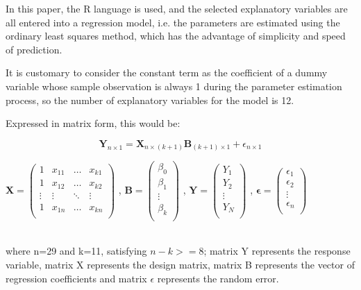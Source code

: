 \documentclass{apmcmthesis}
\begin{document}
In this paper, the R language is used, and the selected explanatory variables are all entered into a regression model, i.e. the parameters are estimated using the ordinary least squares method, which has the advantage of simplicity and speed of prediction. 

It is customary to consider the constant term as the coefficient of a dummy variable whose sample observation is always 1 during the parameter estimation process, so the number of explanatory variables for the model is 12. 

Expressed in matrix form, this would be:

$$ \textbf{Y}_{n\times 1}=\textbf{X}_{n\times(k+1)}\textbf{B}_{(k+1)\times 1}+\epsilon_{n\times 1}$$

$
\mathbf{X} = \left(
\begin{array}{cccc}
	1 & x_{11} & \ldots & x_{k1}\\
	1 & x_{12} & \ldots & x_{k2}\\
	\vdots & \vdots & \ddots & \vdots\\
	1 & x_{1n} & \ldots & x_{kn}\\
\end{array} \right)
$ , 
$
\mathbf{B} = \left(
\begin{array}{c}
	\beta_0 \\
	\beta_1\\
	\vdots \\
	\beta_k\\
\end{array} \right)
$ , $
\mathbf{Y} = \left(
\begin{array}{c}
	Y_1 \\
	Y_2\\
	\vdots \\
	Y_N\\
\end{array} \right)
$ , $
\mathbf{\epsilon} = \left(
\begin{array}{c}
	\epsilon_1 \\
	\epsilon_2\\
	\vdots \\
	\epsilon_n\\
\end{array} \right)
$ 

\hspace*{\fill}\\

where n=29 and k=11, satisfying $ n-k>=8 $; matrix Y represents the response variable, matrix X represents the design matrix, matrix B represents the vector of regression coefficients and matrix $ \epsilon $ represents the random error. 
\end{document}
